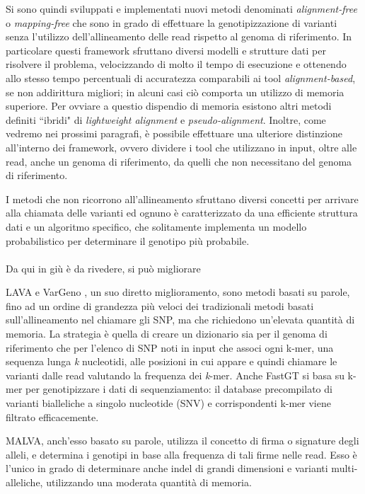 \documentclass[../main.tex]{subfiles}
\begin{document}
\noindent
Si sono quindi sviluppati e implementati nuovi metodi denominati \textit{alignment-free} o \textit{mapping-free} che sono in grado di effettuare la genotipizzazione di varianti senza l'utilizzo dell'allineamento delle read rispetto al genoma di riferimento. In particolare questi framework sfruttano diversi modelli e strutture dati per risolvere il problema, velocizzando di molto il tempo di esecuzione e ottenendo allo stesso tempo percentuali di accuratezza comparabili ai tool \textit{alignment-based}, se non addirittura migliori; in alcuni casi ciò comporta un utilizzo di memoria superiore. Per ovviare a questio dispendio di memoria esistono altri metodi definiti ``ibridi" di \textit{lightweight alignment} e \textit{pseudo-alignment}. \textcolor{BurntOrange}{Inoltre, come vedremo nei prossimi paragrafi, è possibile effettuare una ulteriore distinzione all'interno dei framework, ovvero dividere i tool che utilizzano in input, oltre alle read, anche un genoma di riferimento, da quelli che non necessitano del genoma di riferimento.}

I metodi che non ricorrono all'allineamento sfruttano diversi concetti per arrivare alla chiamata delle varianti ed ognuno è caratterizzato da una efficiente struttura dati e un algoritmo specifico, che solitamente implementa un modello probabilistico per determinare il genotipo più probabile. 
\\\\
\textcolor{BurntOrange}{Da qui in giù è da rivedere, si può migliorare}

LAVA \cite{shajii2016lava} e VarGeno \cite{sun-medvedev2018vargeno}, un suo diretto miglioramento, sono metodi basati su parole, fino ad un ordine di grandezza più veloci dei tradizionali metodi basati sull'allineamento nel chiamare gli SNP, ma che richiedono un'elevata quantità di memoria. La strategia è quella di creare un dizionario sia per il genoma di riferimento che per l'elenco di SNP noti in input che associ ogni k-mer, una sequenza lunga \textit{k} nucleotidi, alle posizioni in cui appare e quindi chiamare le varianti dalle read valutando la frequenza dei \textit{k}-mer. Anche FastGT \cite{pajuste2017fastgt} si basa su k-mer per genotipizzare i dati di sequenziamento: il database precompilato di varianti bialleliche a singolo nucleotide (SNV) e corrispondenti k-mer viene filtrato efficacemente.

MALVA, anch'esso basato su parole, utilizza il concetto di firma o signature degli alleli, e determina i genotipi in base alla frequenza di tali firme nelle read. Esso è l'unico in grado di determinare anche indel di grandi dimensioni e varianti multi-alleliche, utilizzando una moderata quantità di memoria.
\end{document}
